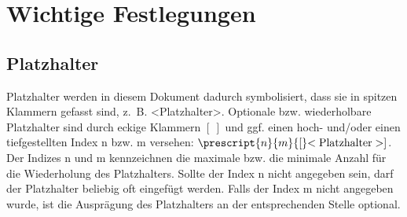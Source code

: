 \chapter{Wichtige Festlegungen}\label{chap:Wichtige Festlegungen}
\section{Platzhalter}\label{sec:Platzhalter}
Platzhalter werden in diesem Dokument dadurch symbolisiert, dass sie in spitzen Klammern gefasst sind, z.~B. <Platzhalter>. Optionale bzw. wiederholbare Platzhalter sind durch eckige Klammern $[~]$ und ggf. einen hoch- und/oder einen tiefgestellten Index n bzw. m versehen: $\prescript{n}{m}{[}\mathrm{<Platzhalter>}]$. Der Indizes n und m kennzeichnen die maximale bzw. die minimale Anzahl für die Wiederholung des Platzhalters. Sollte der Index n nicht angegeben sein, darf der Platzhalter beliebig oft eingefügt werden. Falls der Index m nicht angegeben wurde, ist die Ausprägung des Platzhalters an der entsprechenden Stelle optional.
